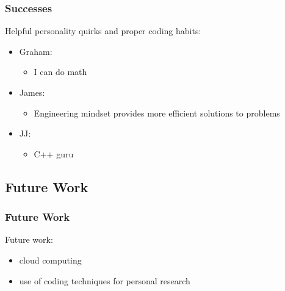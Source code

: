 \documentclass[usernames,dvipsnames]{beamer}
\begin{document}
\begin{frame}	
	\frametitle{Successes}
	
	\begin{exampleblock}{Helpful personality quirks and proper coding habits:}
		\begin{itemize}
			\setlength\itemsep{0.5pt}
			\item Graham: \\
				\begin{itemize}
					\setlength\itemsep{0.5pt}
					\item I can do math
				\end{itemize}
			\item James: \\
				\begin{itemize}
					\setlength\itemsep{0.5pt}
					\item Engineering mindset provides more efficient solutions to problems
				\end{itemize}
			\item JJ: \\
				\begin{itemize}
					\setlength\itemsep{0.5pt}
					\item C++ guru
				\end{itemize}
		\end{itemize}
	\end{exampleblock}

\end{frame}

\subsection{Future Work}

\begin{frame}	
	\frametitle{Future Work}
	
	\begin{block}{Future work:}
		\begin{itemize}
			\item cloud computing
			\item use of coding techniques for personal research
		\end{itemize}
	\end{block}
	
\end{frame}




 
\end{document}
